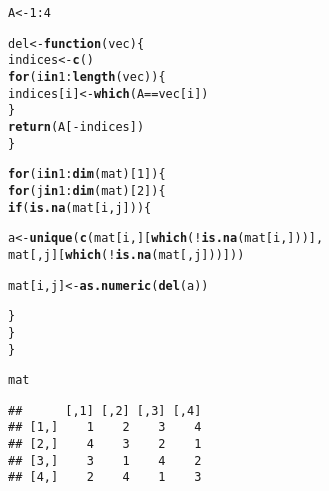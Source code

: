 \documentclass[11pt, a4paper]{article}\usepackage[]{graphicx}\usepackage[]{xcolor}
\makeatletter
\newcommand{\hlnum}[1]{\textcolor[rgb]{0.686,0.059,0.569}{#1}}%
\newcommand{\hlopt}[1]{\textcolor[rgb]{0,0,0}{#1}}%
\newcommand{\hldef}[1]{\textcolor[rgb]{0.345,0.345,0.345}{#1}}%
\newcommand{\hlkwa}[1]{\textcolor[rgb]{0.161,0.373,0.58}{\textbf{#1}}}%
\newcommand{\hlkwb}[1]{\textcolor[rgb]{0.69,0.353,0.396}{#1}}%
\newcommand{\hlkwc}[1]{\textcolor[rgb]{0.333,0.667,0.333}{#1}}%
\newcommand{\hlkwd}[1]{\textcolor[rgb]{0.737,0.353,0.396}{\textbf{#1}}}%
\newenvironment{kframe}{%
 \def\at@end@of@kframe{}%
 \ifinner\ifhmode%
  \def\at@end@of@kframe{\end{minipage}}%
  \begin{minipage}{\columnwidth}%
 \fi\fi%
 \def\FrameCommand##1{\hskip\@totalleftmargin \hskip-\fboxsep
 \colorbox{shadecolor}{##1}\hskip-\fboxsep
     \hskip-\linewidth \hskip-\@totalleftmargin \hskip\columnwidth}%
 \MakeFramed {\advance\hsize-\width
   \@totalleftmargin\z@ \linewidth\hsize
   \@setminipage}}%
 {\par\unskip\endMakeFramed%
 \at@end@of@kframe}
\newenvironment{knitrout}{}{} %
\makeatother
\begin{document}
\begin{knitrout}
\color{fgcolor}\begin{kframe}
\begin{alltt}
\hldef{A} \hlkwb{<-} \hlnum{1}\hlopt{:}\hlnum{4}
\end{alltt}
\end{kframe}
\end{knitrout}

\begin{knitrout}
\color{fgcolor}\begin{kframe}
\begin{alltt}
\hldef{del} \hlkwb{<-} \hlkwa{function}\hldef{(}\hlkwc{vec}\hldef{)\{}
  \hldef{indices} \hlkwb{<-} \hlkwd{c}\hldef{()}
  \hlkwa{for} \hldef{(i} \hlkwa{in} \hlnum{1}\hlopt{:}\hlkwd{length}\hldef{(vec)) \{}
    \hldef{indices[i]} \hlkwb{<-} \hlkwd{which}\hldef{(A} \hlopt{==} \hldef{vec[i])}
  \hldef{\}}
  \hlkwd{return}\hldef{(A[}\hlopt{-}\hldef{indices])}
\hldef{\}}
\end{alltt}
\end{kframe}
\end{knitrout}

\begin{knitrout}
\color{fgcolor}\begin{kframe}
\begin{alltt}
\hlkwa{for} \hldef{(i} \hlkwa{in} \hlnum{1}\hlopt{:}\hlkwd{dim}\hldef{(mat)[}\hlnum{1}\hldef{]) \{}
  \hlkwa{for} \hldef{(j} \hlkwa{in} \hlnum{1}\hlopt{:}\hlkwd{dim}\hldef{(mat)[}\hlnum{2}\hldef{]) \{}
    \hlkwa{if}\hldef{(}\hlkwd{is.na}\hldef{(mat[i, j]))\{}

      \hldef{a} \hlkwb{<-} \hlkwd{unique}\hldef{(} \hlkwd{c}\hldef{( mat[i,][}\hlkwd{which}\hldef{(} \hlopt{!}\hlkwd{is.na}\hldef{(mat[i,]) )],}
                      \hldef{mat[,j][}\hlkwd{which}\hldef{(} \hlopt{!}\hlkwd{is.na}\hldef{(mat[,j]) )]) )}

      \hldef{mat[i, j]} \hlkwb{<-} \hlkwd{as.numeric}\hldef{(}\hlkwd{del}\hldef{(a))}

    \hldef{\}}
  \hldef{\}}
\hldef{\}}
\end{alltt}
\end{kframe}
\end{knitrout}


\begin{knitrout}
\color{fgcolor}\begin{kframe}
\begin{alltt}
\hldef{mat}
\end{alltt}
\begin{verbatim}
##      [,1] [,2] [,3] [,4]
## [1,]    1    2    3    4
## [2,]    4    3    2    1
## [3,]    3    1    4    2
## [4,]    2    4    1    3
\end{verbatim}
\end{kframe}
\end{knitrout}
\end{document}
